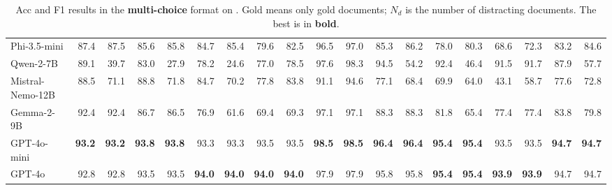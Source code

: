\begin{table}[!ht]
{\begin{tabular}{l|rr|rr|rr|rr|rr|rr|rr|rr|rr}
        Phi-3.5-mini & 87.4  & 87.5  & 85.6  & 85.8  & 84.7  & 85.4  & 79.6  & 82.5  & 96.5  & 97.0  & 85.3  & 86.2  & 78.0  & 80.3  & 68.6  & 72.3  & 83.2  & 84.6 \\
        Qwen-2-7B & 89.1  & 39.7  & 83.0  & 27.9  & 78.2  & 24.6  & 77.0  & 78.5  & 97.6  & 98.3  & 94.5  & 54.2  & 92.4  & 46.4  & 91.5  & 91.7  & 87.9  & 57.7 \\
        Mistral-Nemo-12B & 88.5  & 71.1  & 88.8  & 71.8  & 84.7  & 70.2  & 77.8  & 83.8  & 91.1  & 94.6  & 77.1  & 68.4  & 69.9  & 64.0  & 43.1  & 58.7  & 77.6  & 72.8 \\
        Gemma-2-9B & 92.4  & 92.4  & 86.7  & 86.5  & 76.9  & 61.6  & 69.4  & 69.3  & 97.1  & 97.1  & 88.3  & 88.3  & 81.8  & 65.4  & 77.4  & 77.4  & 83.8  & 79.8 \\
        GPT-4o-mini & \textbf{93.2} & \textbf{93.2} & \textbf{93.8} & \textbf{93.8} & 93.3  & 93.3  & 93.5  & 93.5  & \textbf{98.5} & \textbf{98.5} & \textbf{96.4} & \textbf{96.4} & \textbf{95.4} & \textbf{95.4} & 93.5  & 93.5  & \textbf{94.7} & \textbf{94.7} \\
        GPT-4o & 92.8  & 92.8  & 93.5  & 93.5  & \textbf{94.0} & \textbf{94.0} & \textbf{94.0} & \textbf{94.0} & 97.9  & 97.9  & 95.8  & 95.8  & \textbf{95.4} & \textbf{95.4} & \textbf{93.9} & \textbf{93.9} & 94.7  & 94.7 \\
        \bottomrule
        \end{tabular}%
    }
    \caption{
        Acc and F1  results in the \textbf{multi-choice} format on \benchname.
        Gold means only gold documents; $N_{d}$ is the number of distracting documents.
        The best is in \textbf{bold}.
    }
    \label{tab_main_multichoice}
\end{table}

